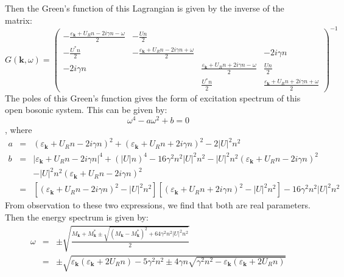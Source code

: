\documentclass{article}
\newcommand{\tmmathbf}[1]{\ensuremath{\boldsymbol{#1}}}
\begin{document}
Then the Green's function of this Lagrangian is given by the inverse of the
matrix:
\begin{equation}
  G (\tmmathbf{k}, \omega) = \left(\begin{array}{cccc}
    - \frac{\varepsilon_{\tmmathbf{k}} + U_R n - 2 i \gamma n - \omega}{2} & -
    \frac{U n}{2} &  & \\
    - \frac{U^{\ast} n}{2} & - \frac{\varepsilon_{\tmmathbf{k}} + U_R n - 2 i
    \gamma n + \omega}{2} &  & - 2 i \gamma n\\
    - 2 i \gamma n &  & \frac{\varepsilon_{\tmmathbf{k}} + U_R n + 2 i \gamma
    n - \omega}{2} & \frac{U n}{2}\\
    &  & \frac{U^{\ast} n}{2} & \frac{\varepsilon_{\tmmathbf{k}} + U_R n + 2
    i \gamma n + \omega}{2}
  \end{array}\right)^{- 1}
\end{equation}
The poles of this Green's function gives the form of excitation spectrum of
this open bosonic system. This can be given by:
\begin{equation}
  \omega^4 - a \omega^2 + b = 0
\end{equation}
, where
\begin{eqnarray}
  a & = & (\varepsilon_{\tmmathbf{k}} + U_R n - 2 i \gamma n)^2 +
  (\varepsilon_{\tmmathbf{k}} + U_R n + 2 i \gamma n)^2 - 2 | U |^2 n^2 \\
  b & = & | \varepsilon_{\tmmathbf{k}} + U_R n - 2 i \gamma n |^4 + (| U |
  n)^4 - 16 \gamma^2 n^2 | U |^2 n^2 - | U |^2 n^2 (\varepsilon_{\tmmathbf{k}}
  + U_R n - 2 i \gamma n)^2 \nonumber\\
  &  & - | U |^2 n^2 (\varepsilon_{\tmmathbf{k}} + U_R n - 2 i \gamma n)^2
  \nonumber\\
  & = & [(\varepsilon_{\tmmathbf{k}} + U_R n - 2 i \gamma n)^2 - | U |^2 n^2]
  [(\varepsilon_{\tmmathbf{k}} + U_R n + 2 i \gamma n)^2 - | U |^2 n^2] - 16
  \gamma^2 n^2 | U |^2 n^2 
\end{eqnarray}
From observation to these two expressions, we find that both are real
parameters. Then the energy spectrum is given by:
\begin{eqnarray}
  \omega & = & \pm \sqrt{\frac{M_{\tmmathbf{k}} + M_{\tmmathbf{k}}^{\ast} \pm
  \sqrt{(M_{\tmmathbf{k}} - M_{\tmmathbf{k}}^{\ast})^2 + 64 \gamma^2 n^2 | U
  |^2 n^2}}{2}} \nonumber\\
  & = & \pm \sqrt{\varepsilon_{\tmmathbf{k}} (\varepsilon_{\tmmathbf{k}} + 2
  U_R n) - 5 \gamma^2 n^2 \pm 4 \gamma n \sqrt{\gamma^2 n^2 -
  \varepsilon_{\tmmathbf{k}} (\varepsilon_{\tmmathbf{k}} + 2 U_R n)}} 
\end{eqnarray}
\end{document}
